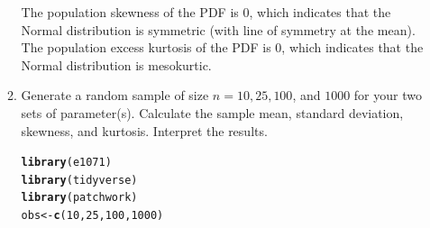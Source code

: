 \documentclass{article}\usepackage[]{graphicx}\usepackage[]{color}
\makeatletter
\newcommand{\hlnum}[1]{\textcolor[rgb]{0.686,0.059,0.569}{#1}}%
\newcommand{\hlstd}[1]{\textcolor[rgb]{0.345,0.345,0.345}{#1}}%
\newcommand{\hlkwb}[1]{\textcolor[rgb]{0.69,0.353,0.396}{#1}}%
\newcommand{\hlkwd}[1]{\textcolor[rgb]{0.737,0.353,0.396}{\textbf{#1}}}%
\newenvironment{kframe}{%
 \def\at@end@of@kframe{}%
 \ifinner\ifhmode%
  \def\at@end@of@kframe{\end{minipage}}%
  \begin{minipage}{\columnwidth}%
 \fi\fi%
 \def\FrameCommand##1{\hskip\@totalleftmargin \hskip-\fboxsep
 \colorbox{shadecolor}{##1}\hskip-\fboxsep
     \hskip-\linewidth \hskip-\@totalleftmargin \hskip\columnwidth}%
 \MakeFramed {\advance\hsize-\width
   \@totalleftmargin\z@ \linewidth\hsize
   \@setminipage}}%
 {\par\unskip\endMakeFramed%
 \at@end@of@kframe}
\newenvironment{knitrout}{}{} %
\makeatother
\begin{document}
\begin{enumerate}
\begin{enumerate}
The population skewness of the PDF is 0, which indicates that the Normal distribution is symmetric (with line of symmetry at the mean). The population excess kurtosis of the PDF is 0, which indicates that the Normal distribution is mesokurtic.
  \item Generate a random sample of size $n=10, 25, 100$, and $1000$ for your 
  two sets of parameter(s). Calculate the sample mean, standard deviation, 
  skewness, and kurtosis. Interpret the results.
  
\begin{knitrout}
\color{fgcolor}\begin{kframe}
\begin{alltt}
\hlkwd{library}\hlstd{(e1071)}
\hlkwd{library}\hlstd{(tidyverse)}
\hlkwd{library}\hlstd{(patchwork)}
\hlstd{obs} \hlkwb{<-} \hlkwd{c}\hlstd{(}\hlnum{10}\hlstd{,} \hlnum{25}\hlstd{,} \hlnum{100}\hlstd{,} \hlnum{1000}\hlstd{)}
\end{alltt}
\end{kframe}
\end{knitrout}
  

\end{enumerate}
\end{enumerate}
\end{document}
